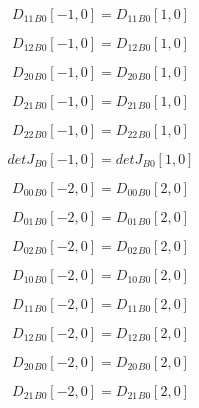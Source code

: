 \documentclass{article}
\begin{document}
\begin{dmath}{D_{11}{_{B0}}}[{-1,0}] = {D_{11}{_{B0}}}[{1,0}]\end{dmath}

\begin{dmath}{D_{12}{_{B0}}}[{-1,0}] = {D_{12}{_{B0}}}[{1,0}]\end{dmath}

\begin{dmath}{D_{20}{_{B0}}}[{-1,0}] = {D_{20}{_{B0}}}[{1,0}]\end{dmath}

\begin{dmath}{D_{21}{_{B0}}}[{-1,0}] = {D_{21}{_{B0}}}[{1,0}]\end{dmath}

\begin{dmath}{D_{22}{_{B0}}}[{-1,0}] = {D_{22}{_{B0}}}[{1,0}]\end{dmath}

\begin{dmath}{detJ{_{B0}}}[{-1,0}] = {detJ{_{B0}}}[{1,0}]\end{dmath}

\begin{dmath}{D_{00}{_{B0}}}[{-2,0}] = {D_{00}{_{B0}}}[{2,0}]\end{dmath}

\begin{dmath}{D_{01}{_{B0}}}[{-2,0}] = {D_{01}{_{B0}}}[{2,0}]\end{dmath}

\begin{dmath}{D_{02}{_{B0}}}[{-2,0}] = {D_{02}{_{B0}}}[{2,0}]\end{dmath}

\begin{dmath}{D_{10}{_{B0}}}[{-2,0}] = {D_{10}{_{B0}}}[{2,0}]\end{dmath}

\begin{dmath}{D_{11}{_{B0}}}[{-2,0}] = {D_{11}{_{B0}}}[{2,0}]\end{dmath}

\begin{dmath}{D_{12}{_{B0}}}[{-2,0}] = {D_{12}{_{B0}}}[{2,0}]\end{dmath}

\begin{dmath}{D_{20}{_{B0}}}[{-2,0}] = {D_{20}{_{B0}}}[{2,0}]\end{dmath}

\begin{dmath}{D_{21}{_{B0}}}[{-2,0}] = {D_{21}{_{B0}}}[{2,0}]\end{dmath}
\end{document}
